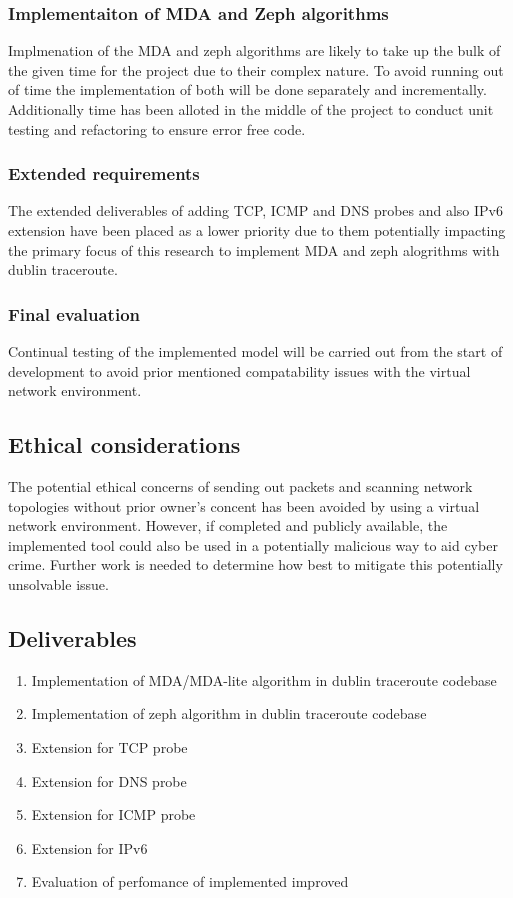 \subsubsection{Implementaiton of MDA and Zeph algorithms}
Implmenation of the MDA and zeph algorithms are likely to take up the bulk of the given time for the project due to their complex nature. To avoid running out of time the implementation of both will be done separately and incrementally. Additionally time has been alloted in the middle of the project to conduct unit testing and refactoring to ensure error free code. 

\subsubsection{Extended requirements}
The extended deliverables of adding TCP, ICMP and DNS probes and also IPv6 extension have been placed as a lower priority due to them potentially impacting the primary focus of this research to implement MDA and zeph alogrithms with dublin traceroute.

\subsubsection{Final evaluation}
Continual testing of the implemented model will be carried out from the start of development to avoid prior mentioned compatability issues with the virtual network environment.

\subsection{Ethical considerations}
The potential ethical concerns of sending out packets and scanning network topologies without prior owner's concent has been avoided by using a virtual network environment. 
However, if completed and publicly available, the implemented tool could also be used in a potentially malicious way to aid cyber crime. Further work is needed to determine how best to mitigate this potentially unsolvable issue.

\subsection{Deliverables}
\begin{enumerate}
  \item Implementation of MDA/MDA-lite algorithm in dublin traceroute codebase
  \item Implementation of zeph algorithm in dublin traceroute codebase
  \item Extension for TCP probe
  \item Extension for DNS probe
  \item Extension for ICMP probe
  \item Extension for IPv6
  \item Evaluation of perfomance of implemented improved 
\end{enumerate}










